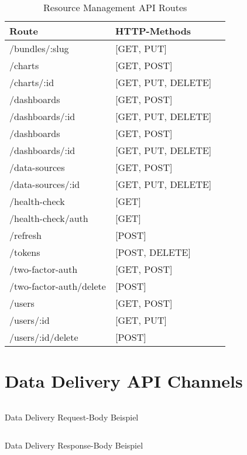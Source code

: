 \begin{table}[h]
\begin{center}
\begin{tabular}{llc}
Route & HTTP-Methods \\
\hline
/bundles/:slug          & [GET, PUT]         \\
/charts                 & [GET, POST]        \\
/charts/:id             & [GET, PUT, DELETE] \\
/dashboards             & [GET, POST]        \\
/dashboards/:id         & [GET, PUT, DELETE] \\
/dashboards             & [GET, POST]        \\
/dashboards/:id         & [GET, PUT, DELETE] \\
/data-sources           & [GET, POST]        \\
/data-sources/:id       & [GET, PUT, DELETE] \\
/health-check           & [GET]              \\
/health-check/auth      & [GET]              \\
/refresh                & [POST]             \\
/tokens                 & [POST, DELETE]     \\
/two-factor-auth        & [GET, POST]        \\
/two-factor-auth/delete & [POST]             \\
/users                  & [GET, POST]        \\
/users/:id              & [GET, PUT]         \\
/users/:id/delete       & [POST]             \\
\end{tabular}
\end{center}
\caption{Resource Management API Routes}
\label{tab:resourcemanagementapiroutes}
\end{table}

\newpage

\section*{Data Delivery API Channels}
\label{sec:resourcemanagementapiroutes}

\begin{listing}[h]
    \inputminted{jsx}{snippets/json/data-delivery-example/request.data-delivery.txt}
    \caption{Data Delivery Request-Body Beispiel}
    \label{lst:datadelvieryrequestbodybeispiel}
\end{listing}

\begin{listing}[h]
    \inputminted{jsx}{snippets/json/data-delivery-example/response.data-delivery.json}
    \caption{Data Delivery Response-Body Beispiel}
    \label{lst:datadeliveryresponsebodybeispiel}
\end{listing}
